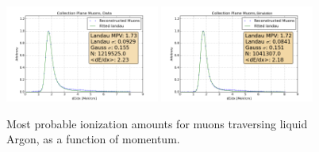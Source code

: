 \begin{figure}[tb]
  \centering
  \includegraphics[width=0.45\textwidth]{lartpc_figures/collection_muons_total.png}
  \includegraphics[width=0.45\textwidth]{lartpc_figures/collection_muons_total_sim.png}
  \caption[Muon dE/dx Distributions]{Most probable ionization amounts for muons traversing liquid Argon, as a function of momentum.}
  \label{fig:coll_mpv_muons}
\end{figure}


